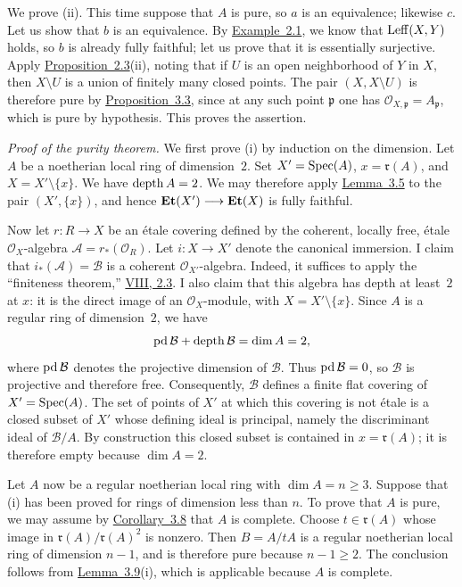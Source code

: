 We prove \textup{(ii)}. This time suppose that $A$ is pure, so $a$ is an
equivalence; likewise $c$. Let us show that $b$ is an equivalence. By
\hyperref[X.2.1]{Example~2.1}, we know that $\operatorname{Leff}(X,Y)$ holds, so $b$ is already fully
faithful; let us prove that it is essentially surjective. Apply
\hyperref[X.2.3]{Proposition~2.3}\textup{(ii)}, noting that if $U$ is an open neighborhood of
$Y$ in $X$, then $X\setminus U$ is a union of finitely many closed points.
The pair $(X,X\setminus U)$ is therefore pure by \hyperref[X.3.3]{Proposition~3.3}, since at
any such point $\mathfrak p$ one has
$\mathcal O_{X,\mathfrak p}=A_{\mathfrak p}$, which is pure by hypothesis.
This proves the assertion.

\medskip
\textit{Proof of the purity theorem.}
We first prove \textup{(i)} by induction on the dimension. Let $A$ be a
noetherian local ring of dimension~$2$. Set
$X'=\operatorname{Spec}(A)$, $x=\mathfrak r(A)$, and $X=X'\setminus\{x\}$. We have
$\operatorname{depth} A=2$. We may therefore apply \hyperref[X.3.5]{Lemma~3.5} to the pair
$(X',\{x\})$, and hence
$\mathbf{Et}(X')\longrightarrow\mathbf{Et}(X)$ is fully faithful.

Now let $r\colon R\longrightarrow X$ be an \'{e}tale covering defined by
the coherent, locally free, \'{e}tale $\mathcal O_X$-algebra
$\mathcal A=r_*(\mathcal O_R)$. Let $i\colon X\longrightarrow X'$ denote
the canonical immersion. I claim that
$i_*(\mathcal A)=\mathcal B$ is a coherent $\mathcal O_{X'}$-algebra.
Indeed, it suffices to apply the ``finiteness theorem,'' \hyperref[VIII.2.3]{VIII, 2.3}. I also
claim that this algebra has depth at least~$2$ at $x$: it is the direct image
of an $\mathcal O_X$-module, with $X=X'\setminus\{x\}$. Since $A$ is a
regular ring of dimension~$2$, we have
\[
  \operatorname{pd} \mathcal B+\operatorname{depth} \mathcal B=\dim A=2,
\]
where $\operatorname{pd} \mathcal B$ denotes the projective dimension of $\mathcal B$.
Thus $\operatorname{pd} \mathcal B=0$, so $\mathcal B$ is projective and therefore
free. Consequently, $\mathcal B$ defines a finite flat covering of
$X'=\operatorname{Spec}(A)$. The set of points of $X'$ at which this covering is not
\'{e}tale is a closed subset of $X'$ whose defining ideal is principal,
namely the discriminant ideal of $\mathcal B/A$. By construction this closed
subset is contained in $x=\mathfrak r(A)$; it is therefore empty because
$\dim A=2$.

Let $A$ now be a regular noetherian local ring with $\dim A=n\geq 3$.
Suppose that \textup{(i)} has been proved for rings of dimension less than
$n$. To prove that $A$ is pure, we may assume by \hyperref[X.3.8]{Corollary~3.8} that $A$ is
complete. Choose $t\in\mathfrak r(A)$ whose image in
$\mathfrak r(A)/\mathfrak r(A)^2$ is nonzero. Then $B=A/tA$ is a regular
noetherian local ring of dimension $n-1$, and is therefore pure because
$n-1\geq 2$. The conclusion follows from \hyperref[X.3.9]{Lemma~3.9}\textup{(i)}, which is
applicable because $A$ is complete.

